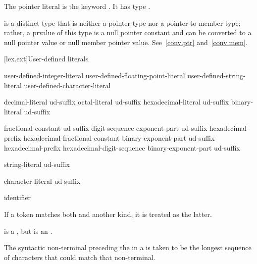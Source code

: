 \pnum
The pointer literal is the keyword . It has type
.
\begin{note}
 is a distinct type that is neither a pointer type nor a pointer-to-member type;
rather, a prvalue of this type is a null pointer constant and can be
converted to a null pointer value or null member pointer value. See~\ref{conv.ptr}
and~\ref{conv.mem}.
\end{note}

[lex.ext]{User-defined literals}

%
\begin{bnf}
\br
    user-defined-integer-literal\br
    user-defined-floating-point-literal\br
    user-defined-string-literal\br
    user-defined-character-literal
\end{bnf}

\begin{bnf}
\br
    decimal-literal ud-suffix\br
    octal-literal ud-suffix\br
    hexadecimal-literal ud-suffix\br
    binary-literal ud-suffix
\end{bnf}

\begin{bnf}
\br
    fractional-constant  ud-suffix\br
    digit-sequence exponent-part ud-suffix\br
    hexadecimal-prefix hexadecimal-fractional-constant binary-exponent-part ud-suffix\br
    hexadecimal-prefix hexadecimal-digit-sequence binary-exponent-part ud-suffix
\end{bnf}

\begin{bnf}
\br
    string-literal ud-suffix
\end{bnf}

\begin{bnf}
\br
    character-literal ud-suffix
\end{bnf}

\begin{bnf}
\br
    identifier
\end{bnf}

\pnum
If a token matches both  and another  kind, it
is treated as the latter.
\begin{example}
is a , but  is an
.
\end{example}
The syntactic non-terminal preceding the  in a
 is taken to be the longest sequence of
characters that could match that non-terminal.

